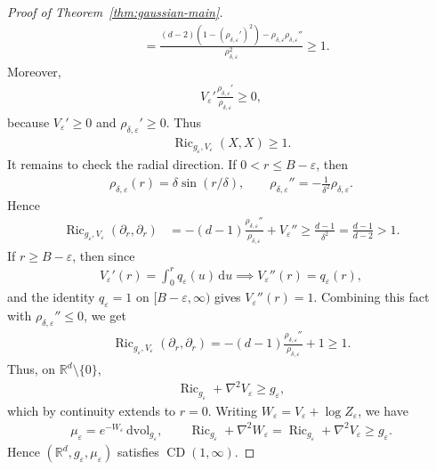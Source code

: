 \documentclass[11pt,reqno]{amsart}
\numberwithin{equation}{section}
\theoremstyle{definition}
\theoremstyle{remark}
\newcommand{\ud}{\mathrm{d}}
\newcommand{\0}{\emptyset}
\newcommand{\veps}{\varepsilon}
\newcommand{\bbR}{\mathbb R}
\newcommand{\Ric}{\operatorname{Ric}}
\newcommand{\dvol}{\,\mathrm{dvol}}
\newcommand{\CD}{\operatorname{CD}}
\begin{document}
\begin{proof}[Proof of Theorem~\ref{thm:gaussian-main}]
\begin{align}
        &=
        \frac{(d-2)(1-(\rho_{\delta,\veps}')^2)
        -\rho_{\delta,\veps}\rho_{\delta,\veps}''}
        {\rho_{\delta,\veps}^2}\geq1.
\end{align}
Moreover,
\begin{align}
        V_\veps'\frac{\rho_{\delta,\veps}'}{\rho_{\delta,\veps}}\geq0,
\end{align}
because \(V_\veps'\geq0\) and \(\rho_{\delta,\veps}'\geq0\). Thus
\begin{align}
        \Ric_{g_\veps,V_\veps}(X,X)\geq1.
\end{align}
It remains to check the radial direction. If \(0<r\leq B-\veps\), then
\begin{align}
        \rho_{\delta,\veps}(r)
        =
        \delta\sin(r/\delta),
        \qquad
        \rho_{\delta,\veps}''
        =
        -\frac{1}{\delta^2}\rho_{\delta,\veps}.
\end{align}
Hence
\begin{align}
        \Ric_{g_\veps,V_\veps}(\partial_r,\partial_r)
        &=
        -(d-1)\frac{\rho_{\delta,\veps}''}{\rho_{\delta,\veps}}
        +
        V_\veps''\geq
        \frac{d-1}{\delta^2}=
        \frac{d-1}{d-2}
        >
        1.
\end{align}
If \(r\geq B-\veps\), then since
\begin{align}
        V_\veps'(r)
        =
        \int_0^r q_\veps(u)\,\ud u
        \implies
        V_\veps''(r)=q_\veps(r),
\end{align}
and the identity $q_\veps=1$ on $[B-\veps,\infty)$ gives \(V_\veps''(r)=1\). Combining this fact with
\(\rho_{\delta,\veps}''\leq0\), we get
\begin{align}
        \Ric_{g_\veps,V_\veps}(\partial_r,\partial_r)
        =
        -(d-1)\frac{\rho_{\delta,\veps}''}{\rho_{\delta,\veps}}
        +
        1
        \geq1.
\end{align}
Thus, on \(\bbR^d\setminus\{0\}\),
\begin{align}
        \Ric_{g_\veps}+\nabla^2V_\veps\geq g_\veps,
\end{align}
which by continuity extends to $r=0.$ Writing \(W_\veps=V_\veps+\log Z_\veps\), we have
\begin{align}
        \mu_\veps=e^{-W_\veps}\dvol_{g_\veps},
        \qquad
        \Ric_{g_\veps}+\nabla^2W_\veps
        =
        \Ric_{g_\veps}+\nabla^2V_\veps
        \geq g_\veps.
\end{align}
Hence \((\bbR^d,g_\veps,\mu_\veps)\) satisfies \(\CD(1,\infty)\).

\end{proof}
\end{document}
